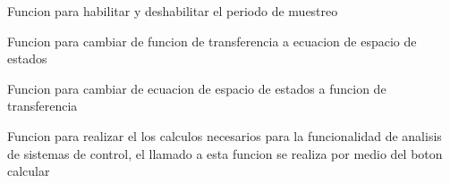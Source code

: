 \documentclass[letterpaper,10pt,spanish]{sphinxmanual}
\begin{document}

\begin{fulllineitems}
\label{\detokenize{codigos/analisisHandler:analisisHandler.analisis_bool_discreto}}
Funcion para habilitar y deshabilitar el periodo de muestreo

\end{fulllineitems}


\begin{fulllineitems}
\label{\detokenize{codigos/analisisHandler:analisisHandler.analisis_stacked_to_ss}}
Funcion para cambiar de funcion de transferencia a ecuacion de espacio de estados

\end{fulllineitems}


\begin{fulllineitems}
\label{\detokenize{codigos/analisisHandler:analisisHandler.analisis_stacked_to_tf}}
Funcion para cambiar de ecuacion de espacio de estados a funcion de transferencia

\end{fulllineitems}


\begin{fulllineitems}
\label{\detokenize{codigos/analisisHandler:analisisHandler.calcular_analisis}}
Funcion para realizar el los calculos necesarios para la funcionalidad de analisis de sistemas de control, el llamado a esta funcion se realiza por medio del boton calcular

\end{fulllineitems}
\end{document}
